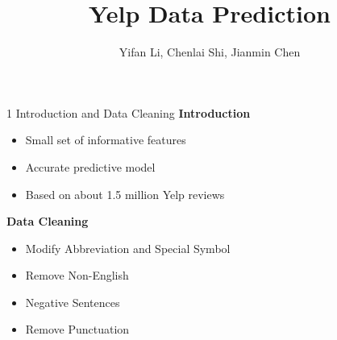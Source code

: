 \documentclass[10pt]{beamer}
\title{Yelp Data Prediction}
\date{}
\author{Yifan Li, Chenlai Shi, Jianmin Chen}
\institute{Monday Group 1}
\begin{document}
\maketitle



\begin{frame}{1 Introduction and Data Cleaning}
\textbf{Introduction}
\begin{itemize}
	\item Small set of informative features
	\item Accurate predictive model
	\item Based on about 1.5 million Yelp reviews
\end{itemize}

\textbf{Data Cleaning}
\begin{itemize}
	\item Modify Abbreviation and Special Symbol

	\item Remove Non-English

	\item Negative Sentences
	
	\item Remove Punctuation
\end{itemize}
\end{frame}


\end{document}
